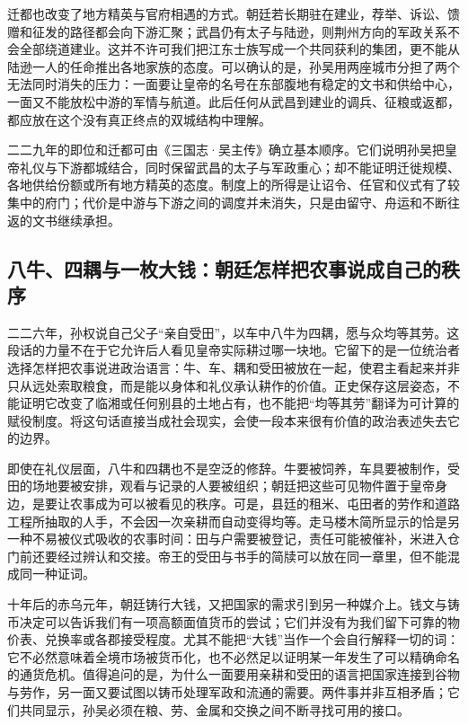 迁都也改变了地方精英与官府相遇的方式。朝廷若长期驻在建业，荐举、诉讼、馈赠和征发的路径都会向下游汇聚；武昌仍有太子与陆逊，则荆州方向的军政关系不会全部绕道建业。这并不许可我们把江东士族写成一个共同获利的集团，更不能从陆逊一人的任命推出各地家族的态度。可以确认的是，孙吴用两座城市分担了两个无法同时消失的压力：一面要让皇帝的名号在东部腹地有稳定的文书和供给中心，一面又不能放松中游的军情与航道。此后任何从武昌到建业的调兵、征粮或返都，都应放在这个没有真正终点的双城结构中理解。

\begin{turningpoint}[黄龙元年的迁都把江河国家的两种时间并置]
二二九年的即位和迁都可由《三国志·吴主传》确立基本顺序。它们说明孙吴把皇帝礼仪与下游都城结合，同时保留武昌的太子与军政重心；却不能证明迁徙规模、各地供给份额或所有地方精英的态度。制度上的所得是让诏令、任官和仪式有了较集中的府门；代价是中游与下游之间的调度并未消失，只是由留守、舟运和不断往返的文书继续承担。
\end{turningpoint}

\subsection{八牛、四耦与一枚大钱：朝廷怎样把农事说成自己的秩序}
二二六年，孙权说自己父子“亲自受田”，以车中八牛为四耦，愿与众均等其劳。这段话的力量不在于它允许后人看见皇帝实际耕过哪一块地。它留下的是一位统治者选择怎样把农事说进政治语言：牛、车、耦和受田被放在一起，使君主看起来并非只从远处索取粮食，而是能以身体和礼仪承认耕作的价值。正史保存这层姿态，不能证明它改变了临湘或任何别县的土地占有，也不能把“均等其劳”翻译为可计算的赋役制度。将这句话直接当成社会现实，会使一段本来很有价值的政治表述失去它的边界。

即使在礼仪层面，八牛和四耦也不是空泛的修辞。牛要被饲养，车具要被制作，受田的场地要被安排，观看与记录的人要被组织；朝廷把这些可见物件置于皇帝身边，是要让农事成为可以被看见的秩序。可是，县廷的租米、屯田者的劳作和道路工程所抽取的人手，不会因一次亲耕而自动变得均等。走马楼木简所显示的恰是另一种不易被仪式吸收的农事时间：田与户需要被登记，责任可能被催补，米进入仓门前还要经过辨认和交接。帝王的受田与书手的简牍可以放在同一章里，但不能混成同一种证词。

十年后的赤乌元年，朝廷铸行大钱，又把国家的需求引到另一种媒介上。钱文与铸币决定可以告诉我们有一项高额面值货币的尝试；它们并没有为我们留下可靠的物价表、兑换率或各郡接受程度。尤其不能把“大钱”当作一个会自行解释一切的词：它不必然意味着全境市场被货币化，也不必然足以证明某一年发生了可以精确命名的通货危机。值得追问的是，为什么一面要用亲耕和受田的语言把国家连接到谷物与劳作，另一面又要试图以铸币处理军政和流通的需要。两件事并非互相矛盾；它们共同显示，孙吴必须在粮、劳、金属和交换之间不断寻找可用的接口。

